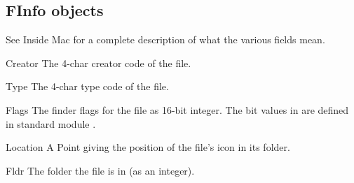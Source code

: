 \subsection{FInfo objects}

See Inside Mac for a complete description of what the various fields
mean.

\renewcommand{\indexsubitem}{(FInfo object attribute)}
\begin{datadesc}{Creator}
The 4-char creator code of the file.
\end{datadesc}

\begin{datadesc}{Type}
The 4-char type code of the file.
\end{datadesc}

\begin{datadesc}{Flags}
The finder flags for the file as 16-bit integer. The bit values in
 are defined in standard module .
\end{datadesc}

\begin{datadesc}{Location}
A Point giving the position of the file's icon in its folder.
\end{datadesc}

\begin{datadesc}{Fldr}
The folder the file is in (as an integer).
\end{datadesc}
